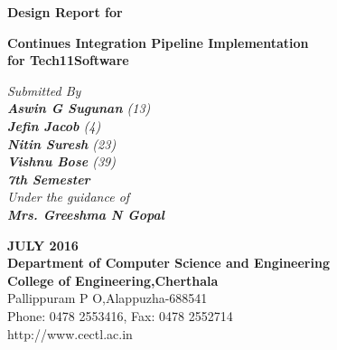 \documentclass[12pt,a4paper,oneside]{report}
\begin{document}
\renewcommand\bibname{References}
\begin{titlepage}
\begin{center}
\large{\textbf{Design Report for}}\\
\begin{singlespace}
\LARGE{\textbf{Continues Integration Pipeline Implementation \\ for
Tech11Software
}}\\
\end{singlespace}
\Large{\textit{Submitted By }}\\
\Large{\textit{\textbf{Aswin G Sugunan}     (13)}}\\
\Large{\textit{\textbf{Jefin Jacob}    (4)}}\\
\Large{\textit{\textbf{Nitin Suresh}   (23)}}\\
\Large{\textit{\textbf{Vishnu Bose}   (39)}}\\
\Large{\textit{\textbf{7th Semester}   }}\\

\Large{\textit{\textit{Under the guidance of}}}\\
\Large{\textit{\textbf{Mrs. Greeshma N Gopal }}}\\
\vspace{.05in}

\vspace{.05in}
\begin{figure}[h]
\begin{center}
\end{center}
\end{figure}
\begin{singlespace}
\end{singlespace}
\begin{singlespace}
\Large{\textbf{JULY 2016\\Department of Computer Science and Engineering\\College of Engineering,Cherthala}\\Pallippuram P O,Alappuzha-688541\\Phone: 0478 2553416, Fax: 0478 2552714\\http://www.cectl.ac.in}
\end{singlespace}
\end{center}
\end{titlepage}
\end{document}
